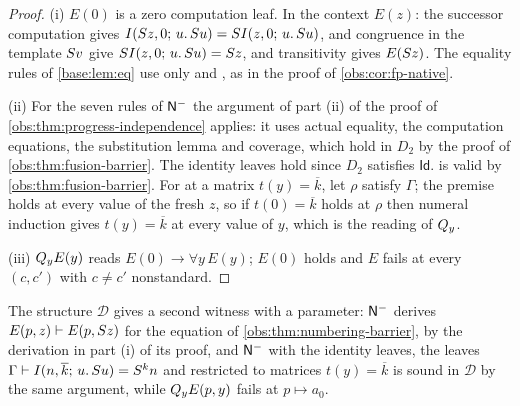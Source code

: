 \begin{proof}
(i) $E(0)$ is a zero computation leaf. In the context $E(z)$: the successor
computation gives $I(S z,0;\,u.\,S u)=SI(z,0;\,u.\,S u)$,
 and congruence in the template $S v$ give
$SI(z,0;\,u.\,S u)=S z$, and transitivity gives $E(S z)$. The
equality rules of \cref{base:lem:eq} use only  and ,
as in the proof of \cref{obs:cor:fp-native}.

(ii) For the seven rules of $\mathsf{N}^{-}$ the argument of part (ii) of the proof
of \cref{obs:thm:progress-independence} applies: it uses actual equality, the
computation equations, the substitution lemma and coverage, which hold in
$D_2$ by the proof of \cref{obs:thm:fusion-barrier}. The identity leaves hold
since $D_2$ satisfies $\mathsf{Id}$.  is valid by
\cref{obs:thm:fusion-barrier}. For  at a matrix $t(y)=\overline{k}$,
let $\rho$ satisfy $\Gamma$; the premise holds at every value of the fresh $z$,
so if $t(0)=\overline{k}$ holds at $\rho$ then numeral induction gives
$t(y)=\overline{k}$ at every value of $y$, which is the reading of $Q_{y}$.

(iii) $Q_{y}E(y)$ reads $E(0)\to\forall y\,E(y)$; $E(0)$ holds and $E$ fails at
every $(c,c')$ with $c\ne c'$ nonstandard.
\end{proof}

The structure $\mathcal{D}$ gives a second witness with a parameter:
$\mathsf{N}^{-}$ derives $E(p,z)\vdash E(p,S z)$ for the equation of
\cref{obs:thm:numbering-barrier}, by the derivation in part (i) of its proof,
and $\mathsf{N}^{-}$ with the identity leaves, the leaves
$\Gamma\vdash I(n,\overline{k};\,u.\,S u)=S^{k}n$ and 
restricted to matrices $t(y)=\overline{k}$ is sound in $\mathcal{D}$ by the
same argument, while $Q_{y}E(p,y)$ fails at $p\mapsto a_0$.

